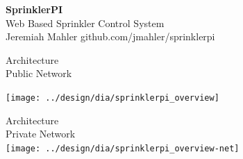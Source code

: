\documentclass{article}
\begin{document}
\begin{sideways}

\begin{minipage}{\textheight}
\begin{center}
{\fontsize{110}{120}\selectfont \textbf{SprinklerPI}} \\
\vspace{0.5in}
{\fontsize{30}{80}\selectfont Web Based Sprinkler Control System} \\
\vspace{2.0in}
{\fontsize{25}{80}\selectfont Jeremiah Mahler \hspace{1.0in} github.com/jmahler/sprinklerpi} \\
\vspace{0.2in}
\end{center}
\end{minipage}

\end{sideways}

\pagebreak

\begin{center}

{\fontsize{20}{80}\selectfont Architecture} \\
\vspace*{0.2in}
{\fontsize{18}{80}\selectfont Public Network} \\
\vspace*{0.3in}

\texttt{[image: ../design/dia/sprinklerpi\_overview]}



\end{center}

\pagebreak

\begin{center}

{\fontsize{20}{80}\selectfont Architecture} \\
\vspace*{0.2in}
{\fontsize{18}{80}\selectfont Private Network} \\
\vspace*{0.3in}
\texttt{[image: ../design/dia/sprinklerpi\_overview-net]}

\end{center}
\end{document}
